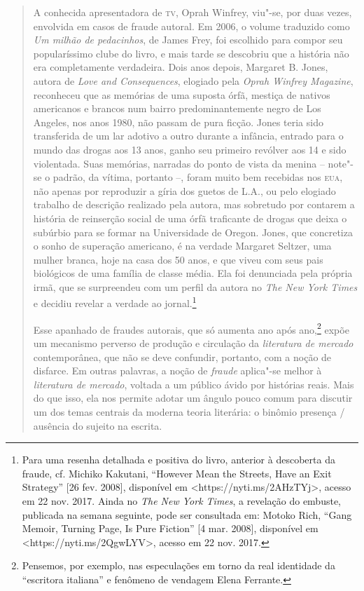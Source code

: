 \begin{quote}
A conhecida apresentadora de \textsc{tv}, Oprah Winfrey, viu"-se, por
duas vezes, envolvida em casos de fraude autoral. Em 2006, o volume
traduzido como \emph{Um milhão de pedacinhos}, de James Frey, foi
escolhido para compor seu popularíssimo clube do livro, e mais tarde se
descobriu que a história não era completamente verdadeira. Dois anos
depois, Margaret B. Jones, autora de \emph{Love and Consequences},
elogiado pela \emph{Oprah Winfrey Magazine}, reconheceu que as memórias
de uma suposta órfã, mestiça de nativos americanos e brancos num bairro
predominantemente negro de Los Angeles, nos anos 1980, não passam de
pura ficção. Jones teria sido transferida de um lar adotivo a outro
durante a infância, entrado para o mundo das drogas aos 13 anos, ganho
seu primeiro revólver aos 14 e sido violentada. Suas memórias, narradas
do ponto de vista da menina -- note"-se o padrão, da vítima, portanto --,
foram muito bem recebidas nos \textsc{eua}, não apenas por reproduzir a
gíria dos guetos de L.A., ou pelo elogiado trabalho de descrição
realizado pela autora, mas sobretudo por contarem a história de
reinserção social de uma órfã traficante de drogas que deixa o subúrbio
para se formar na Universidade de Oregon. Jones, que concretiza o sonho
de superação americano, é na verdade Margaret Seltzer, uma mulher
branca, hoje na casa dos 50 anos, e que viveu com seus pais biológicos
de uma família de classe média. Ela foi denunciada pela própria irmã,
que se surpreendeu com um perfil da autora no \emph{The New York Times}
e decidiu revelar a verdade ao jornal.\footnote{Para uma resenha
  detalhada e positiva do livro, anterior à descoberta da fraude, cf.
  Michiko Kakutani, ``However Mean the Streets, Have an Exit Strategy''
  {[}26 fev. 2008{]}, disponível em
  \textless{}https://nyti.ms/2AHzTYj\textgreater{},
  acesso em 22 nov. 2017. Ainda no \emph{The New York Times}, a
  revelação do embuste, publicada na semana seguinte, pode ser
  consultada em: Motoko Rich, ``Gang Memoir, Turning Page, Is Pure
  Fiction'' {[}4 mar. 2008{]}, disponível em
  \textless{}https://nyti.ms/2QgwLYV\textgreater{},
  acesso em 22 nov. 2017.}

Esse apanhado de fraudes autorais, que só aumenta ano após
ano,\footnote{Pensemos, por exemplo, nas especulações em torno da real
  identidade da ``escritora italiana'' e fenômeno de vendagem Elena
  Ferrante.} expõe um mecanismo perverso de produção e circulação da
\emph{literatura de mercado} contemporânea, que não se deve confundir,
portanto, com a noção de disfarce. Em outras palavras, a noção de
\emph{fraude} aplica"-se melhor à \emph{literatura de mercado}, voltada a
um público ávido por histórias reais. Mais do que isso, ela nos permite
adotar um ângulo pouco comum para discutir um dos temas centrais da
moderna teoria literária: o binômio presença / ausência do sujeito na
escrita.
\end{quote}

